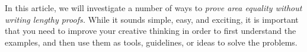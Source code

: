 \begin{multicols}{2}
	\setlength{\abovedisplayskip}{6pt}
	\setlength{\belowdisplayskip}{6pt}
	In this article, we will investigate a number of ways to \textit{prove area equality without writing lengthy proofs.}
	While it sounds simple, easy, and exciting, it is important that you need to improve your creative thinking in order to 
	first understand the examples, and then use them as tools, guidelines, or ideas to solve the problems.
	\vskip 0.2cm
	\begin{figure}[H]
		\vspace*{-10pt}

\end{figure}
\end{multicols}
